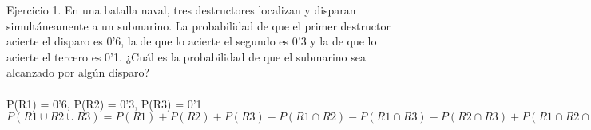 \documentclass{article}
\begin{document}
Ejercicio 1. En una batalla naval, tres destructores localizan y disparan simultáneamente a un submarino. La probabilidad de que el primer destructor acierte el disparo es 0'6, la de que lo acierte el segundo es 0'3 y la de que lo acierte el tercero es 0'1. ¿Cuál es la probabilidad de que el submarino sea alcanzado por algún disparo? \\ \\
P(R1) = 0'6, P(R2) = 0'3, P(R3) = 0'1 \\
$P(R1 \cup R2 \cup R3) = P(R1) + P(R2) + P(R3) - P(R1 \cap R2) - P(R1 \cap R3) - P(R2 \cap R3) + P(R1 \cap R2 \cap R3) = 0'6+0'3+0'1-(0'6*0'1)-(0'6*0'3)-(0'1*0'3)+(0'6*0'3*0'1) = 0'748 $\\
\end{document}

